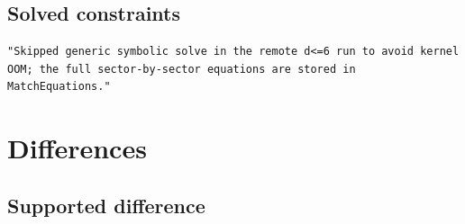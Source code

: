 \documentclass[11pt]{article}
\begin{document}
\subsection{Solved constraints}
\begin{verbatim}
"Skipped generic symbolic solve in the remote d<=6 run to avoid kernel OOM; the full sector-by-sector equations are stored in MatchEquations."
\end{verbatim}
\section{Differences}
\subsection{Supported difference}
\begin{verbatim}

\end{verbatim}
\end{document}
